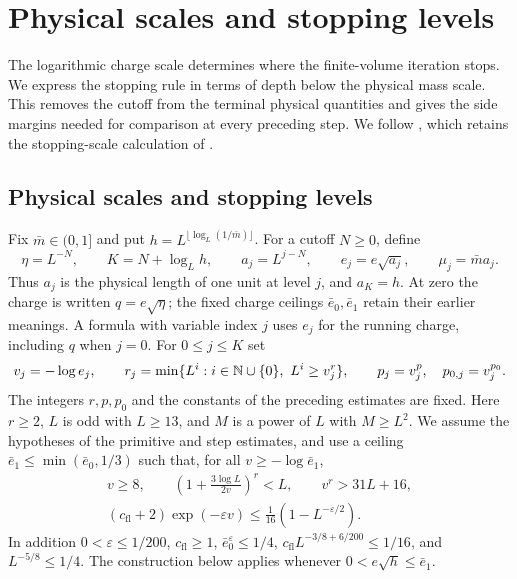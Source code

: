 \section{Physical scales and stopping levels}\label{sec:rg-flow}

The logarithmic charge scale determines where the finite-volume
iteration stops. We express the stopping rule in terms of depth below
the physical mass scale. This removes the cutoff from the terminal
physical quantities and gives the side margins needed for comparison
at every preceding step.
We follow \cite[\S16.1]{QED3Master}, which retains the stopping-scale
calculation of \cite[Chapter~19]{LatticeCurvature}.

\subsection{Physical scales and stopping levels}
\label{subsec:rgfl-scales}

Fix $\bar m\in(0,1]$ and put
$h=L^{\lfloor\log_L(1/\bar m)\rfloor}$.
For a cutoff $N\ge0$, define
\begin{equation}\label{eq:rgfl-physical-scales}
 \eta=L^{-N},\qquad K=N+\log_Lh,\qquad
 a_j=L^{j-N},\qquad e_j=e\sqrt{a_j},\qquad
 \mu_j=\bar m a_j.
\end{equation}
Thus $a_j$ is the physical length of one unit at
level $j$, and $a_K=h$.
At zero the charge is written $q=e\sqrt\eta$;
the fixed charge ceilings $\bar e_0,\bar e_1$ retain their
earlier meanings. A formula with variable index $j$
uses $e_j$ for the running charge, including $q$
when $j=0$.
For $0\le j\le K$ set
\[
 v_j=-\log e_j,\qquad
 r_j=\min\{L^i:i\in\mathbb N\cup\{0\},\ L^i\ge v_j^r\},
 \qquad p_j=v_j^p,\quad p_{0,j}=v_j^{p_0}.
\]
The integers $r,p,p_0$ and the constants of the
preceding estimates are fixed.
Here $r\ge2$, $L$ is odd with $L\ge13$, and $M$
is a power of $L$ with $M\ge L^2$.
We assume the hypotheses of the primitive and
step estimates, and use a ceiling
$\bar e_1\le\min(\bar e_0,1/3)$ such that, for all
$v\ge-\log\bar e_1$,
\begin{equation}\label{eq:rgfl-scale-smallness}
 \begin{gathered}
 v\ge8,\qquad
 \left(1+\frac{3\log L}{2v}\right)^r<L,\qquad
 v^r>31L+16,\\
 (c_{\mathrm{fl}}+2)\exp(-\varepsilon v)
               \le\frac1{16}(1-L^{-\varepsilon/2}).
 \end{gathered}
\end{equation}
In addition
$0<\varepsilon\le1/200$,
$c_{\mathrm{fl}}\ge1$,
$\bar e_0^\varepsilon\le1/4$,
$c_{\mathrm{fl}}L^{-3/8+6/200}\le1/16$, and
$L^{-5/8}\le1/4$.
The construction below applies whenever
$0<e\sqrt h\le\bar e_1$.


